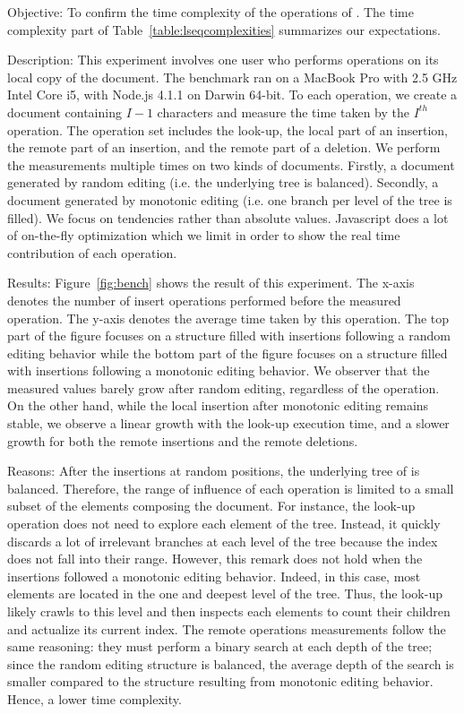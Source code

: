 \begin{asparadesc}
\item [Objective:] To confirm the time complexity of the operations of
  \LSEQ. The time complexity part of Table~\ref{table:lseqcomplexities}
  summarizes our expectations.
\item [Description:] This experiment involves one user who performs operations
  on its local copy of the document. The benchmark ran on a MacBook Pro with 2.5
  GHz Intel Core i5, with Node.js 4.1.1 on Darwin 64-bit. To each operation, we
  create a document containing $I-1$ characters and measure the time taken by
  the $I^{th}$ operation. The operation set includes the look-up, the local part
  of an insertion, the remote part of an insertion, and the remote part of a
  deletion. We perform the measurements multiple times on two kinds of
  documents. Firstly, a document generated by random editing (i.e. the
  underlying \LSEQ tree is balanced). Secondly, a document generated by
  monotonic editing (i.e. one branch per level of the \LSEQ tree is filled).  We
  focus on tendencies rather than absolute values. Javascript does a lot of
  on-the-fly optimization which we limit in order to show the real time
  contribution of each operation.
\item [Results:] Figure~\ref{fig:bench} shows the result of this experiment. The
  x-axis denotes the number of insert operations performed before the measured
  operation. The y-axis denotes the average time taken by this operation. The
  top part of the figure focuses on a structure filled with insertions following
  a random editing behavior while the bottom part of the figure focuses on a
  structure filled with insertions following a monotonic editing behavior. We
  observer that the measured values barely grow after random editing, regardless
  of the operation. On the other hand, while the local insertion after monotonic
  editing remains stable, we observe a linear growth with the look-up execution
  time, and a slower growth for both the remote insertions and the remote
  deletions.
\item [Reasons:] After the insertions at random positions, the underlying tree
  of \LSEQ is balanced. Therefore, the range of influence of each operation is
  limited to a small subset of the elements composing the document. For
  instance, the look-up operation does not need to explore each element of the
  tree. Instead, it quickly discards a lot of irrelevant branches at each level
  of the tree because the index does not fall into their range. However, this
  remark does not hold when the insertions followed a monotonic editing
  behavior. Indeed, in this case, most elements are located in the one and
  deepest level of the tree. Thus, the look-up likely crawls to this level and
  then inspects each elements to count their children and actualize its current
  index. The remote operations measurements follow the same reasoning: they must
  perform a binary search at each depth of the tree; since the random editing
  structure is balanced, the average depth of the search is smaller compared to
  the structure resulting from monotonic editing behavior. Hence, a lower time
  complexity.
\end{asparadesc}

